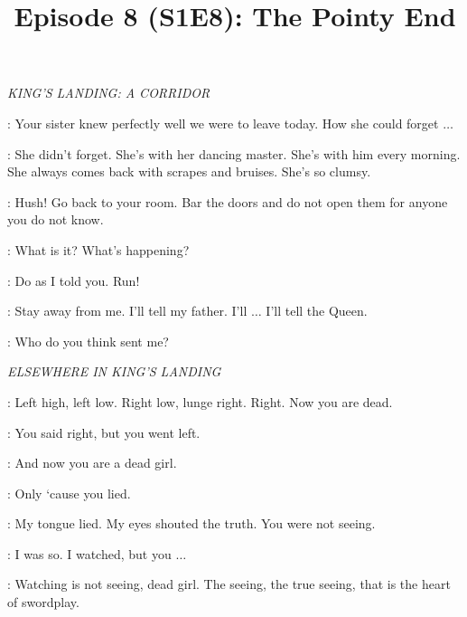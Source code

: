 

\title{Episode 8 (S1E8): The Pointy End}
\author{}
\date{}
\maketitle




\scene

\textit{KING'S LANDING: A CORRIDOR} 


\SEPTAMORDANE: Your sister knew perfectly well we were to leave today. How she could forget $\ldots$  

\SANSA: She didn't forget. She's with her dancing master. She's with him every morning. She always comes back with scrapes and bruises. She's so clumsy. 


\SEPTAMORDANE: Hush! Go back to your room. Bar the doors and do not open them for anyone you do not know. 

\SANSA: What is it? What's happening? 

\SEPTAMORDANE: Do as I told you. Run! 


\SANSA: Stay away from me. I'll tell my father. I'll $\ldots$ I'll tell the Queen. 

\HOUND: Who do you think sent me? 


\scene

\textit{ELSEWHERE IN KING'S LANDING} 


\SYRIO: Left high, left low. Right low, lunge right. Right.  Now you are dead.

\ARYA: You said right, but you went left. 

\SYRIO: And now you are a dead girl. 

\ARYA: Only `cause you lied. 

\SYRIO: My tongue lied. My eyes shouted the truth. You were not seeing. 

\ARYA: I was so. I watched, but you $\ldots$ 

\SYRIO: Watching is not seeing, dead girl. The seeing, the true seeing, that is the heart of swordplay. 


